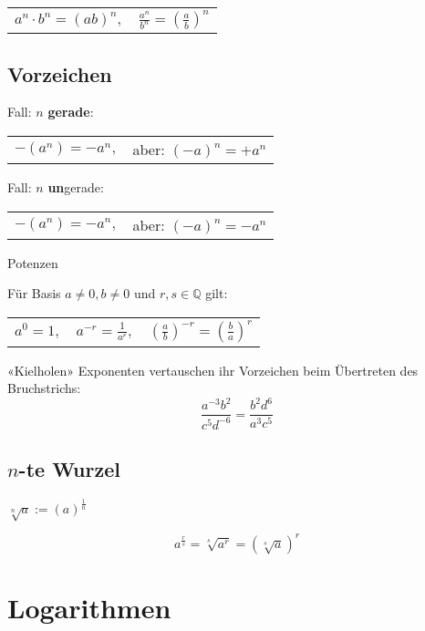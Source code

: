 \begin{multicols}{2}
\begin{tabular}{cc}
$a^n\cdot{}b^n = (ab)^n,$ & $\frac{a^n}{b^n} =\left(\frac{a}b\right)^n $\\
 \end{tabular}
 

\subsection*{Vorzeichen}
Fall: $n$ \textbf{gerade}:

\begin{tabular}{cc}
 $-(a^n) = -a^n,$ & aber: $(-a)^n = +a^n$\\
 \end{tabular} 

Fall: $n$ \textbf{un}gerade:

\begin{tabular}{cc}
 $-(a^n) = -a^n,$ & aber: $(-a)^n = -a^n$\\
 \end{tabular} 


\begin{gesetz*}{Potenzen}{}

Für Basis $a\ne 0, b\ne 0$ und $r, s\in\mathbb{Q}$ gilt:

\begin{tabular}{ccc}
$a^0=1,$ & $a^{-r} = \frac1{a^r},$ & $\left(\frac{a}b\right)^{-r} = \left(\frac{b}a\right)^r$ \\
 \end{tabular}
\end{gesetz*}

\begin{rezept*}{«Kielholen»}{}{}
Exponenten vertauschen ihr Vorzeichen beim Übertreten des Bruchstrichs:
$$\frac{a^{-3}b^2}{c^5d^{-6}} = \frac{b^2d^6}{a^3c^5}$$
\end{rezept*}

\forceCB{}
\subsection*{$n$-te Wurzel}
$\sqrt[n]{a} := \left(a\right)^\frac1n$
\begin{gesetz*}{}{}
$$a^{\frac{r}s} = \sqrt[s]{a^r} = \left(\sqrt[s]a\right)^r$$
\end{gesetz*}

\hrulefill
\section*{Logarithmen}


\end{multicols}
